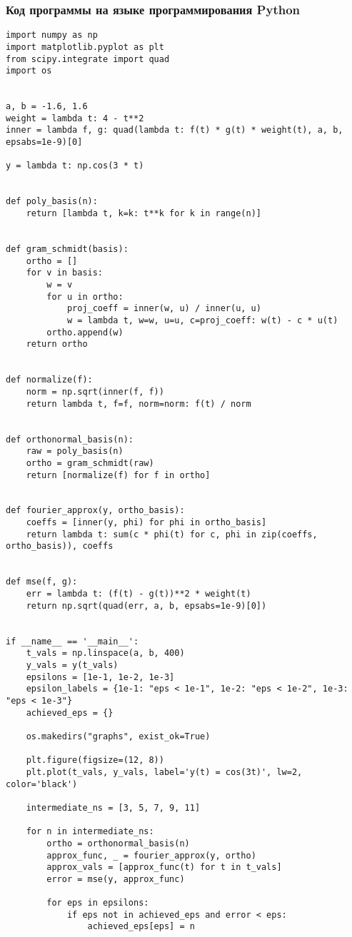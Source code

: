 \documentclass{article}
\begin{document}
\subsubsection*{Код программы на языке программирования Python}
\begin{verbatim}
import numpy as np
import matplotlib.pyplot as plt
from scipy.integrate import quad
import os


a, b = -1.6, 1.6
weight = lambda t: 4 - t**2
inner = lambda f, g: quad(lambda t: f(t) * g(t) * weight(t), a, b, epsabs=1e-9)[0]

y = lambda t: np.cos(3 * t)


def poly_basis(n):
    return [lambda t, k=k: t**k for k in range(n)]


def gram_schmidt(basis):
    ortho = []
    for v in basis:
        w = v
        for u in ortho:
            proj_coeff = inner(w, u) / inner(u, u)
            w = lambda t, w=w, u=u, c=proj_coeff: w(t) - c * u(t)
        ortho.append(w)
    return ortho


def normalize(f):
    norm = np.sqrt(inner(f, f))
    return lambda t, f=f, norm=norm: f(t) / norm


def orthonormal_basis(n):
    raw = poly_basis(n)
    ortho = gram_schmidt(raw)
    return [normalize(f) for f in ortho]


def fourier_approx(y, ortho_basis):
    coeffs = [inner(y, phi) for phi in ortho_basis]
    return lambda t: sum(c * phi(t) for c, phi in zip(coeffs, ortho_basis)), coeffs


def mse(f, g):
    err = lambda t: (f(t) - g(t))**2 * weight(t)
    return np.sqrt(quad(err, a, b, epsabs=1e-9)[0])


if __name__ == '__main__':
    t_vals = np.linspace(a, b, 400)
    y_vals = y(t_vals)
    epsilons = [1e-1, 1e-2, 1e-3]
    epsilon_labels = {1e-1: "eps < 1e-1", 1e-2: "eps < 1e-2", 1e-3: "eps < 1e-3"}
    achieved_eps = {}

    os.makedirs("graphs", exist_ok=True)

    plt.figure(figsize=(12, 8))
    plt.plot(t_vals, y_vals, label='y(t) = cos(3t)', lw=2, color='black')

    intermediate_ns = [3, 5, 7, 9, 11]

    for n in intermediate_ns:
        ortho = orthonormal_basis(n)
        approx_func, _ = fourier_approx(y, ortho)
        approx_vals = [approx_func(t) for t in t_vals]
        error = mse(y, approx_func)

        for eps in epsilons:
            if eps not in achieved_eps and error < eps:
                achieved_eps[eps] = n


\end{verbatim}
\end{document}
